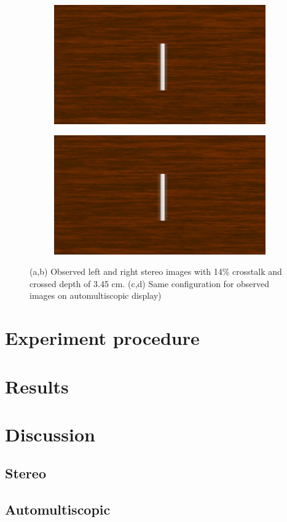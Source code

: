 \begin{figure}[htbp]
    \begin{subfigure}[b]{0.5\textwidth}
        \includegraphics[width=\textwidth]{./Template_Figures/auto_ghost_left}
        \caption{}\label{fig:obs_aut_left}
    \end{subfigure}
    \begin{subfigure}[b]{0.5\textwidth}
        \includegraphics[width=\textwidth]{./Template_Figures/auto_ghost_left}
        \caption{}\label{fig:obs_aut_right}
    \end{subfigure}
    \caption{(a,b) Observed left and right stereo images with 14\% crosstalk and crossed depth of 3.45 cm. (c,d) Same configuration for observed images on automultiscopic display)\label{fig:observed_ct_images}}
\end{figure}

\section{Experiment procedure}


\section{Results}

\section {Discussion}
\subsection{Stereo}
\subsection{Automultiscopic}


